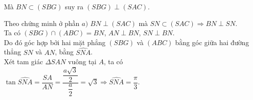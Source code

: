 \begin{bt}
{\begin{listEX}[1]
			Mà $BN \subset (SBG)$ suy ra  $(SBG) \perp(SAC)$.
			\item Theo chứng minh ở  phần $a)$ $BN \perp (SAC)$ mà $SN \subset (SAC) \Rightarrow BN \perp SN$.\\
			 Ta có $(SBG) \cap (ABC)=BN$, $AN \perp BN$, $SN \perp BN$. \\
			Do đó góc hợp bởi hai mặt phẳng $(SBG)$ và $(ABC)$  bằng góc giữa hai đường thẳng $SN$ và $AN$, bằng $\widehat{SNA}$. \\
			Xét tam giác $\Delta SAN$ vuông tại $A$, ta có $\tan \widehat{SNA} = \dfrac{SA}{AN}=\dfrac{\dfrac{a\sqrt{3}}{2}}{\dfrac{a}{2}}=\sqrt{3} \Rightarrow  \widehat{SNA} = \dfrac{\pi}{3}$.
		\end{listEX}
	} 
\end{bt}

